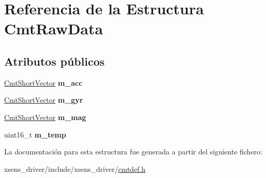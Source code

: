 \hypertarget{structCmtRawData}{\section{\-Referencia de la \-Estructura \-Cmt\-Raw\-Data}
\label{structCmtRawData}
}
\subsection*{\-Atributos públicos}
\begin{DoxyCompactItemize}
\item 
\hypertarget{structCmtRawData_a95bedabfa01215401cea7a9b1dbeafba}{\hyperlink{structCmtShortVector}{\-Cmt\-Short\-Vector} {\bfseries m\-\_\-acc}}\label{structCmtRawData_a95bedabfa01215401cea7a9b1dbeafba}

\item 
\hypertarget{structCmtRawData_ac301e11dc7e7566f6b6731d67a1f6c83}{\hyperlink{structCmtShortVector}{\-Cmt\-Short\-Vector} {\bfseries m\-\_\-gyr}}\label{structCmtRawData_ac301e11dc7e7566f6b6731d67a1f6c83}

\item 
\hypertarget{structCmtRawData_a7ad1c12fae7df066b9f5e5638237ab2f}{\hyperlink{structCmtShortVector}{\-Cmt\-Short\-Vector} {\bfseries m\-\_\-mag}}\label{structCmtRawData_a7ad1c12fae7df066b9f5e5638237ab2f}

\item 
\hypertarget{structCmtRawData_a95df83dd3f0f535b06851e03f93a3d3a}{uint16\-\_\-t {\bfseries m\-\_\-temp}}\label{structCmtRawData_a95df83dd3f0f535b06851e03f93a3d3a}

\end{DoxyCompactItemize}


\-La documentación para esta estructura fue generada a partir del siguiente fichero\-:\begin{DoxyCompactItemize}
\item 
xsens\-\_\-driver/include/xsens\-\_\-driver/\hyperlink{cmtdef_8h}{cmtdef.\-h}\end{DoxyCompactItemize}

